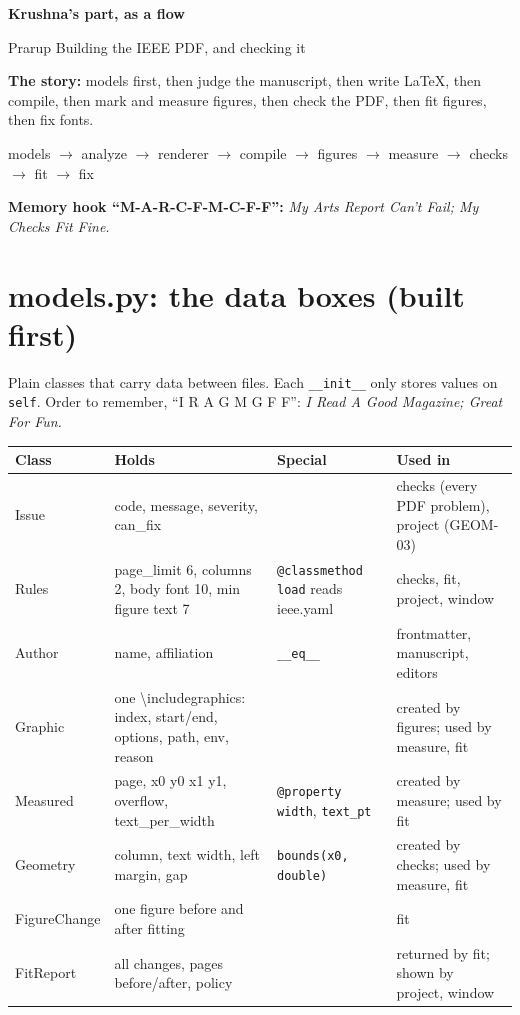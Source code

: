 \documentclass[10.5pt,a4paper]{article}
\newcommand{\cc}[1]{\texttt{#1}}
\begin{document}
{\sffamily\bfseries\huge\color{slate} Krushna's part, as a flow}\par
{\large Prarup \textperiodcentered{} Building the IEEE PDF, and checking it}\par
\medskip
\textbf{The story:} models first, then judge the manuscript, then write LaTeX, then compile, then mark and measure figures, then check the PDF, then fit figures, then fix fonts.

\begin{center}\small\ttfamily
models \(\rightarrow\) analyze \(\rightarrow\) renderer \(\rightarrow\) compile \(\rightarrow\) figures \(\rightarrow\) measure \(\rightarrow\) checks \(\rightarrow\) fit \(\rightarrow\) fix
\end{center}
\textbf{Memory hook ``M-A-R-C-F-M-C-F-F'':} \emph{My Arts Report Can't Fail; My Checks Fit Fine.}

\section{models.py: the data boxes (built first)}
Plain classes that carry data between files. Each \cc{\_\_init\_\_} only stores values on \cc{self}.
Order to remember, ``I R A G M G F F'': \emph{I Read A Good Magazine; Great For Fun.}

\begin{tabularx}{\linewidth}{>{\ttfamily}l >{\raggedright\arraybackslash}X >{\raggedright\arraybackslash}p{30mm} >{\raggedright\arraybackslash}X}
\toprule
\textrm{\textbf{Class}} & \textbf{Holds} & \textbf{Special} & \textbf{Used in}\\
\midrule
Issue & code, message, severity, can\_fix & & checks (every PDF problem), project (GEOM-03)\\
Rules & page\_limit 6, columns 2, body font 10, min figure text 7 & \cc{@classmethod load} reads ieee.yaml & checks, fit, project, window\\
Author & name, affiliation & \cc{\_\_eq\_\_} & frontmatter, manuscript, editors\\
Graphic & one \textbackslash includegraphics: index, start/end, options, path, env, reason & & created by figures; used by measure, fit\\
Measured & page, x0 y0 x1 y1, overflow, text\_per\_width & \cc{@property width}, \cc{text\_pt} & created by measure; used by fit\\
Geometry & column, text width, left margin, gap & \cc{bounds(x0, double)} & created by checks; used by measure, fit\\
FigureChange & one figure before and after fitting & & fit\\
FitReport & all changes, pages before/after, policy & & returned by fit; shown by project, window\\
\bottomrule
\end{tabularx}
\end{document}
